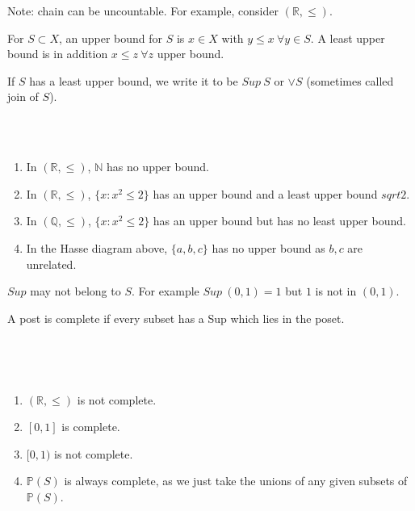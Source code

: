 Note: chain can be uncountable. For example, consider $(\mathbb{R},\le)$.
\begin{definition} For $S \subset X$, an upper bound for $S$ is $x \in X$
with $y \le x ~\forall y \in S$. A least upper bound is in addition $x \le z
~\forall z$ upper bound.
\end{definition}
If $S$ has a least upper bound, we write it to be $Sup~S$ or $\vee S$
(sometimes called join of $S$).~\\
~\\
\begin{example}
~\\
\begin{enumerate}
\item In $(\mathbb{R}, \le)$, $\mathbb{N}$ has no upper bound.\\
\item In $(\mathbb{R}, \le)$, $\{x: x^2 \le 2\}$ has an upper bound
and a least upper bound $sqrt{2}$.\\
\item In $(\mathbb{Q}, \le)$, $\{x: x^2 \le 2\}$ has an upper bound
but has no least upper bound.\\
\item In the Hasse diagram above, $\{a,b,c\}$ has no upper bound as
$b,c$ are unrelated.
\end{enumerate}
\end{example}
\begin{remark} $Sup$ may not belong to $S$. For example $Sup~(0,1) = 1$
but $1$ is not in $(0,1)$.
\end{remark}
\begin{definition} A post is complete if every subset has a Sup
which lies in the poset.
\end{definition}
~\\
\begin{example}
~\\
\begin{enumerate}
\item $(\mathbb{R}, \le)$ is not complete.\\
\item $[0,1]$ is complete.\\
\item $[0,1)$ is not complete.\\
\item $\mathbb{P}(S)$ is always complete, as we just take the unions
of any given subsets of $\mathbb{P}(S)$.
\end{enumerate}
\end{example}
